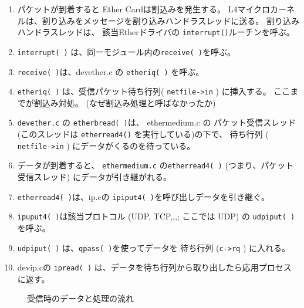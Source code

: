 \begin{enumerate}

\item   パケットが到着すると Ether Cardは割込みを発生する。
      L4マイクロカーネルは、割り込みをメッセージを割り込みハンドラスレッドに送る。
     割り込みハンドラスレッドは、
      該当Etherドライバの \verb|interrupt()|ルーチンを呼ぶ。

\item    \verb|interrupt( )| は、同一モジュール内の\verb|receive( )|を呼ぶ。

\item   \verb|receive( )|は、devether.c の \verb|etheriq( )| を呼ぶ。

\item   \verb|etheriq( )| は、受信パケット待ち行列( \verb|netfile->in| ) に挿入する。
       ここまでが割込み対処。 (なぜ割込み処理と呼ばなかったか)

\item     {\tt devether.c} の \verb|etherbread( )|は、
          ethermedium.c の パケット受信スレッド 
         (このスレッドは \verb|etherread4()| を実行している)の下で、
          待ち行列 ( \verb|netfile->in| ) にデータがくるのを待っている。

\item    データが到着すると、 {\tt ethermedium.c} の\verb|etherread4( )| 
    (つまり、パケット受信スレッド)
    にデータが引き継がれる。

\item   \verb|etherread4( )|は、ip.cの \verb|ipiput4( )|を呼び出しデータを引き継ぐ。

\item   \verb|ipuput4( )|は該当プロトコル (UDP, TCP,,,; ここでは UDP) 
  の \verb|udpiput( )|を呼ぶ。

\item    \verb|udpiput( )| は、\verb|qpass( )|を使ってデータを
  待ち行列 (\verb|c->rq| ) に入れる。

\item   devip.cの \verb|ipread( )| は、データを待ち行列から取り出したら応用プロセスに返す。

\end{enumerate}


\begin{figure}[htb]
  \begin{center}
   \epsfxsize=440pt
    \caption{受信時のデータと処理の流れ}
    \label{fig:ip-recv}
  \end{center}
\end{figure}






